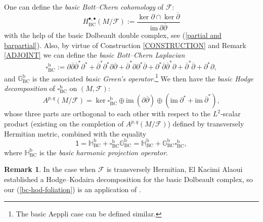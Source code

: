 \documentclass[12pt]{amsart}
\numberwithin{equation}{section}
\theoremstyle{definition}
\theoremstyle{definition}
\theoremstyle{definition}
\newtheorem{remark}  [theorem]     {Remark}
\newcommand{\im}{\mathrm{im}}
\renewcommand{\1}{\mathsf{1}}
\newcommand{\G}{\mathbb{G}}
\newcommand{\db}{\overline{\partial}}
\newcommand{\beq}{\begin{equation}}
\newcommand{\eeq}{\end{equation}}
\renewcommand{\>}{\rightarrow}
\newcommand{\p}{\partial}
\def\p{\partial}
\def\mc{\mathcal}
\theoremstyle{plain} %
\theoremstyle{plain} %
\theoremstyle{plain} %
\begin{document}
	One can define the  \textit{basic Bott--Chern cohomology} of $\mc F$:
	$$H^{\bullet,\bullet}_{\mathrm {BC}}(M/\mc F):=\frac{\ker \p\cap \ker\db}{\im\ \p\db}$$
	with the help of the basic Dolbeault double complex, see (\ref{partial and barpartial}). Also, by virtue of Construction \ref{CONSTRUCTION} and Remark \ref{ADJOINT} we can define the \textit{basic Bott--Chern Laplacian}\beq\label{basic-bc-Lap}
	\square^\mathrm b_{{\mathrm {BC}}}:=\p\db\db^*\p^*+\db^*\p^*\p\db+\db^*\p\p^*\db+\p^*\db\db^*\p+\db^*\db+\p^*\p,
	\eeq and $\G^\mathrm b_{\mathrm {BC}}$ is the associated \textit{basic Green's operator}.\footnote{The basic Aeppli case can be defined similar.}  We then have the \textit{basic Hodge decomposition} of $\square^\mathrm b_{\mathrm {BC}}$ on $(M,\mc F)$:
	\begin{equation}\label{bc-hod-foliation} 	A^{p,q}(M/\mc F)=\ker\square^\mathrm b_{\mathrm {BC}}\oplus \textrm{im}~(\p\db)
		\oplus(\textrm{im}~\p^*+\textrm{im}~\db^*),
	\end{equation}
	whose three parts are orthogonal to each other with respect to the
	$L^2$-scalar product (existing on the completion of $A^{p,q}(M/\mc F)$) defined by transversely Hermitian metric, combined with the equality
	$$\label{identity foliation}
	\1=\mathbb{H}^\mathrm b_{\mathrm {BC}}+\square_{\mathrm {BC}}^\mathrm b\G_{\mathrm {BC}}^\mathrm b=\mathbb{H}^\mathrm b_{\mathrm {BC}}+\G^\mathrm b_{\mathrm {BC}}\square^\mathrm b_{\mathrm {BC}},
	$$
	where $\mathbb{H}^\mathrm b_{\mathrm {BC}}$ is the \textit{basic harmonic projection operator}.
	
	\begin{remark}\label{decompppppp}
		In the case when $\mathcal F$ is transversely Hermitian, El Kacimi Alaoui established a Hodge--Kodaira decomposition for the  basic Dolbeault complex, so our (\ref{bc-hod-foliation}) is an application of \cite[Theorem 3.3.3]{EKA90}.
	\end{remark}
	
	
\end{document}
